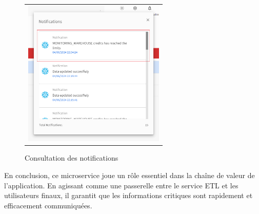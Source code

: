\begin{itemize}
\begin{figure}[H]
\begin{tabular}[b]{c}
        \end{tabular} 
        \begin{tabular}[b]{c}
        \includegraphics[width=0.3\linewidth ,height=7cm]{img/captures/notifications/notifglobal.png} \\
        
        \end{tabular}
        \caption{Consultation des notifications}
    \label{fig:global4}
    \end{figure}
\end{itemize}
\par En conclusion, ce microservice joue un rôle essentiel dans la chaîne de valeur de l'application. En agissant comme une passerelle entre le service ETL et les utilisateurs finaux, il garantit que les informations 
critiques sont rapidement et efficacement communiquées.  
